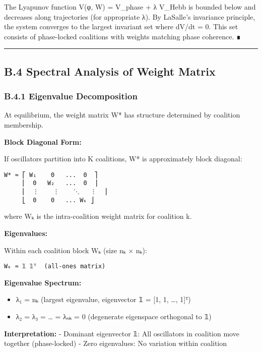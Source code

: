 \documentclass[
]{article}
\providecommand{\tightlist}{%
  \setlength{\itemsep}{0pt}\setlength{\parskip}{0pt}}
\begin{document}
The Lyapunov function V(φ, W) = V\_phase + λ V\_Hebb is bounded below
and decreases along trajectories (for appropriate λ). By LaSalle's
invariance principle, the system converges to the largest invariant set
where dV/dt = 0. This set consists of phase-locked coalitions with
weights matching phase coherence. ∎

\begin{center}\rule{0.5\linewidth}{0.5pt}\end{center}

\subsection{B.4 Spectral Analysis of Weight
Matrix}\label{b.4-spectral-analysis-of-weight-matrix}

\subsubsection{B.4.1 Eigenvalue
Decomposition}\label{b.4.1-eigenvalue-decomposition}

At equilibrium, the weight matrix W* has structure determined by
coalition membership.

\textbf{Block Diagonal Form:}

If oscillators partition into K coalitions, W* is approximately block
diagonal:

\begin{verbatim}
W* ≈ ⎡ W₁    0   ...  0  ⎤
     ⎢  0   W₂   ...  0  ⎥
     ⎢  ⋮    ⋮    ⋱   ⋮  ⎥
     ⎣  0    0   ... Wₖ ⎦
\end{verbatim}

where Wₖ is the intra-coalition weight matrix for coalition k.

\textbf{Eigenvalues:}

Within each coalition block Wₖ (size nₖ × nₖ):

\begin{verbatim}
Wₖ ≈ 𝟙 𝟙ᵀ  (all-ones matrix)
\end{verbatim}

\textbf{Eigenvalue Spectrum:}

\begin{itemize}
\tightlist
\item
  λ₁ = nₖ (largest eigenvalue, eigenvector 𝟙 = {[}1, 1, \ldots, 1{]}ᵀ)
\item
  λ₂ = λ₃ = \ldots{} = λₙₖ = 0 (degenerate eigenspace orthogonal to 𝟙)
\end{itemize}

\textbf{Interpretation:} - Dominant eigenvector 𝟙: All oscillators in
coalition move together (phase-locked) - Zero eigenvalues: No variation
within coalition
\end{document}
